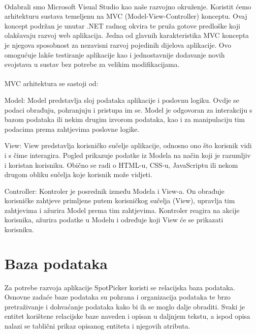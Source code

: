 \paragraph{}{Odabrali smo Microsoft Visual Studio kao naše razvojno okruženje. Koristit ćemo arhitekturu sustava temeljenu na MVC (Model-View-Controller) konceptu. Ovaj koncept podržan je unutar .NET radnog okvira te pruža gotove predloške koji olakšavaju razvoj web aplikacija.
	Jedna od glavnih karakteristika MVC koncepta je njegova sposobnost za nezavisni razvoj pojedinih dijelova aplikacije. Ovo omogućuje lakše testiranje aplikacije kao i jednostavnije dodavanje novih svojstava u sustav bez potrebe za velikim modifikacijama.
}
\paragraph{}{MVC arhitektura se sastoji od:
}
 \begin{packed_enum}
	
	\item Model: Model predstavlja sloj podataka aplikacije i poslovnu logiku. Ovdje se podaci obrađuju, pohranjuju i pristupa im se. Model je odgovoran za interakciju s bazom podataka ili nekim drugim izvorom podataka, kao i za manipulaciju tim podacima prema zahtjevima poslovne logike.
	\item View: View predstavlja korisničko sučelje aplikacije, odnosno ono što korisnik vidi i s čime interagira. Pogled prikazuje podatke iz Modela na način koji je razumljiv i koristan korisniku. Obično se radi o HTML-u, CSS-u, JavaScriptu ili nekom drugom obliku sučelja koje korisnik može vidjeti.
	\item Controller: Kontroler je posrednik između Modela i View-a. On obrađuje korisničke zahtjeve primljene putem korisničkog sučelja (View), upravlja tim zahtjevima i ažurira Model prema tim zahtjevima. Kontroler reagira na akcije korisnika, ažurira podatke u Modelu i određuje koji View će se prikazati korisniku.
	
\end{packed_enum}
\section{Baza podataka}

\paragraph{}
{Za potrebe razvoja aplikacije SpotPicker koristi se relacijska baza podataka. 
Osnovne zadaće baze podataka su pohrana i organizacija podataka te brzo pretraživanje 
i dohvaćanje podataka kako bi ih se moglo dalje obraditi.
Svaki je entitet korištene relacijske baze naveden i opisan u daljnjem tekstu, 
a ispod opisa nalazi se tablični prikaz opisanog entiteta i njegovih atributa.}

